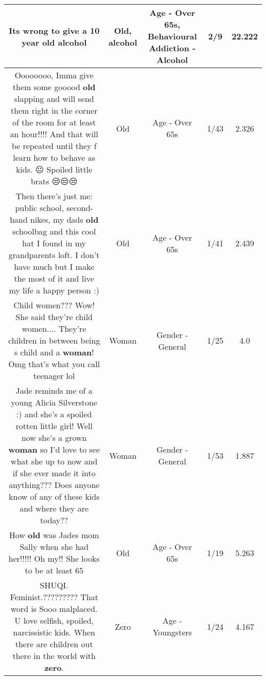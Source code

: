 \documentclass[11pt]{article}
\newlength\mylength
\begin{document}
\begin{center}
\begin{longtable}{|C{.65\mylength}|C{.30\mylength}|C{.12\mylength}|C{.12\mylength}|C{.12\mylength}|}
  \small Its wrong to give a 10 year \textbf{old} alcohol\normalsize   & Old, alcohol & Age - Over 65s, Behavioural Addiction - Alcohol & 2/9 & 22.222 \\  \hline
  \small Oooooooo, Imma give them some gooood \textbf{old} slapping and will send them right in the corner of the room for at least an hour!!!! And that will be repeated until they f learn how to behave as kids.  😐 Spoiled little brats 😒😒😒\normalsize   & Old & Age - Over 65s & 1/43 & 2.326 \\  \hline
  \small Then there's just me: public school, second-hand nikes, my dads \textbf{old} schoolbag and this cool hat I found in my grandparents loft. I don't have much but I make the most of it and live my life a happy person :)\normalsize   & Old & Age - Over 65s & 1/41 & 2.439 \\  \hline
  \small Child women??? Wow! She said they're child women.... They're children in between being s child and a \textbf{woman}! Omg that's what you call teenager lol\normalsize   & Woman & Gender - General & 1/25 & 4.0 \\  \hline
  \small Jade reminds me of a young Alicia Silverstone :) and she's a spoiled rotten little girl! Well now she's a grown \textbf{woman} so I'd love to see what she up to now and if she ever made it into anything??? Does anyone know of any of these kids and where they are today??\normalsize   & Woman & Gender - General & 1/53 & 1.887 \\  \hline
  \small How \textbf{old} was Jades mom Sally when she had her!!!!! Oh my!! She looks to be at least 65\normalsize   & Old & Age - Over 65s & 1/19 & 5.263 \\  \hline
  \small SHUQI. Feminist.????????? That word is Sooo malplaced.  U love selfish, spoiled, narcissistic kids. When there are children out there in the world with \textbf{zero}.\normalsize   & Zero & Age - Youngsters & 1/24 & 4.167 \\  \hline

\end{longtable}
\end{center}
\end{document}
